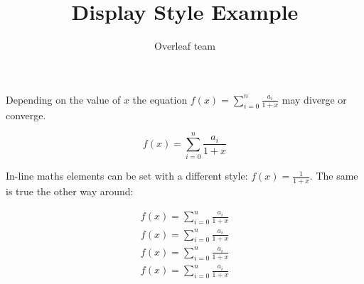 \documentclass{article}
\title{Display Style Example}
\author{Overleaf team}
\begin{document}
\maketitle

Depending on the value of $x$ the equation \( f(x) = \sum_{i=0}^{n} \frac{a_i}{1+x} \) may diverge or converge.

\[ f(x) = \sum_{i=0}^{n} \frac{a_i}{1+x} \]

\vspace{1cm}

In-line maths elements can be set with a different style: \(f(x) = \displaystyle \frac{1}{1+x}\). The same is true the other way around:

\begin{eqnarray*}
f(x) = \sum_{i=0}^{n} \frac{a_i}{1+x} \\
\textstyle f(x) = \sum_{i=0}^{n} \frac{a_i}{1+x} \\
\scriptstyle f(x) = \sum_{i=0}^{n} \frac{a_i}{1+x} \\
\scriptscriptstyle f(x) = \sum_{i=0}^{n} \frac{a_i}{1+x}
\end{eqnarray*}
\end{document}
